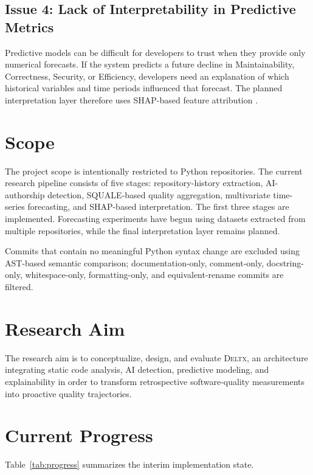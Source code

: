 \documentclass[12pt,a4paper,oneside]{report}
\newcommand{\systemname}{\textsc{Deltx}}
\begin{document}
\subsection{Issue 4: Lack of Interpretability in Predictive Metrics}
Predictive models can be difficult for developers to trust when they provide only numerical forecasts. If the system predicts a future decline in Maintainability, Correctness, Security, or Efficiency, developers need an explanation of which historical variables and time periods influenced that forecast. The planned interpretation layer therefore uses SHAP-based feature attribution \citep{perspective_on_xai_methods_shap_and_lime}.

\section{Scope}
The project scope is intentionally restricted to Python repositories. The current research pipeline consists of five stages: repository-history extraction, AI-authorship detection, SQUALE-based quality aggregation, multivariate time-series forecasting, and SHAP-based interpretation. The first three stages are implemented. Forecasting experiments have begun using datasets extracted from multiple repositories, while the final interpretation layer remains planned.

Commits that contain no meaningful Python syntax change are excluded using AST-based semantic comparison; documentation-only, comment-only, docstring-only, whitespace-only, formatting-only, and equivalent-rename commits are filtered.

\section{Research Aim}
The research aim is to conceptualize, design, and evaluate \systemname{}, an architecture integrating static code analysis, AI detection, predictive modeling, and explainability in order to transform retrospective software-quality measurements into proactive quality trajectories.

\section{Current Progress}
Table~\ref{tab:progress} summarizes the interim implementation state.
\end{document}
